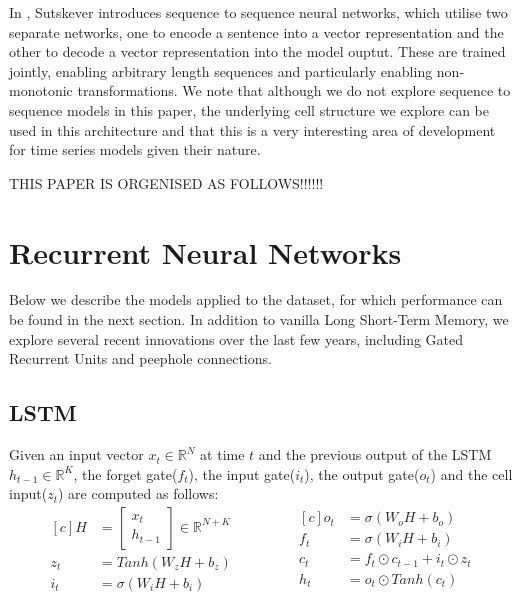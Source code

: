 \documentclass{article} %
\begin{document}
In \cite{Sutskever}, Sutskever introduces sequence to sequence neural networks, which utilise two separate networks, one to encode a sentence into a vector representation and the other to decode a vector representation into the model ouptut. These are trained jointly, enabling arbitrary length sequences and particularly enabling non-monotonic transformations. We note that although we do not explore sequence to sequence models in this paper, the underlying cell structure we explore can be used in this architecture and that this is a very interesting area of development for time series models given their nature.  

{\LARGE \color{red} THIS PAPER IS ORGENISED AS FOLLOWS!!!!!!}



\section{Recurrent Neural Networks}
\label{sec:nn}

Below we describe the models applied to the dataset, for which performance can be found in the next section. In addition to vanilla Long Short-Term Memory, we explore several recent innovations over the last few years, including Gated Recurrent Units and peephole connections. 



\subsection{LSTM}
\label{sec:nn/lstm}


Given an input vector $x_{t} \in \mathbb{R}^{N}$ at time $t$ and the previous output of the LSTM $h_{t-1} \in \mathbb{R}^{K}$, the forget gate($f_{t}$), the input gate($i_{t}$), the output gate($o_{t}$) and the cell input($z_{t}$) are computed as follows:
\begin{equation}
\begin{aligned}[c]
    H &= \left[ \begin{array}{cc}
         x_{t}  \\
         h_{t-1} 
    \end{array} \right] \in \mathbb{R}^{N+K} \\
    z_{t} &= Tanh(W_{z}H + b_{z}) \\
    i_{t} &= \sigma(W_{i}H + b_{i})\\
    \end{aligned}
    \qquad \qquad
    \begin{aligned}[c]
    o_{t} &= \sigma(W_{o}H + b_{o})\\
    f_{t} &= \sigma(W_{i}H + b_{i})\\
    c_{t} &= f_{t} \odot c_{t-1} + i_{t} \odot z_{t} \\
    h_{t} &= o_{t} \odot Tanh(c_{t}) \\
    \end{aligned}
\end{equation}
\end{document}
